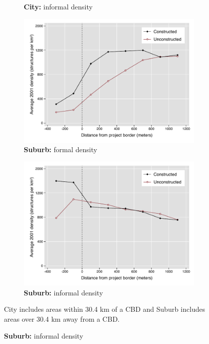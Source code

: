 \documentclass[12pt]{article}
\begin{document}
\begin{figure}[h!]
\begin{subfigure}[b]{0.495\textwidth}
            \caption[]%
            {{\small \textbf{City:} informal density}}    
            \label{fig:preinf_near_het}
        \end{subfigure}
        \begin{subfigure}[b]{0.495\textwidth}
            \centering
            \includegraphics[width=\textwidth,trim={0.3cm .3cm 0.1cm 0cm}, clip=true]{figures/bblu_for_pre_means_het_far_5.pdf}
            \caption[Network2]%
            {{\small \textbf{Suburb:} formal density}}    
            \label{fig:prefor_far_het}
        \end{subfigure}
        \hfill
        \begin{subfigure}[b]{0.495\textwidth}  
            \centering 
            \includegraphics[width=\textwidth,trim={0.3cm .3cm 0.1cm 0cm}, clip=true]{figures/bblu_inf_pre_means_het_far_5.pdf}
            \caption[]%
            {{\small \textbf{Suburb:} informal density}}    
            \label{fig:preinf_far_het}
        \end{subfigure}
        \label{fig:rawbblumeans_het}
        \vspace{-6mm}
    {\scriptsize City includes areas within 30.4 km of a CBD and Suburb includes areas over 30.4 km away from a CBD.}
    \end{figure} 
\end{document}
